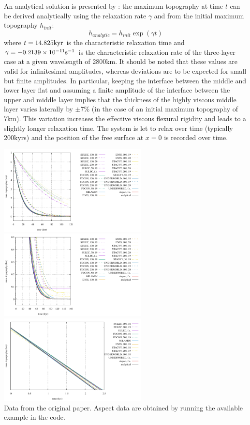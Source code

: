An analytical solution is presented by \cite{ramb67}: 
the maximum topography at time $t$ can be derived analytically using the relaxation rate $\gamma$ 
and from the initial maximum topography $h_{init}$:
\begin{equation}
h_{analytic} =h_{init} \exp (\gamma t)
\end{equation}
where $t = 14.825 {\rm kyr}$ is the characteristic relaxation time and $\gamma = -0.2139 \times 10^{-11} {\rm s}^{-1}$ 
is the characteristic relaxation rate of the three-layer case at a given wavelength of 2800km. 
It should be noted that these values are valid for infinitesimal amplitudes, whereas deviations are to be expected for small but finite amplitudes. In
particular, keeping the interface between the middle and lower layer flat and assuming a finite amplitude of the interface between the upper and middle layer implies that the thickness of the highly viscous middle layer varies laterally by $\pm$7\% (in the case of an initial maximum topography of 7km). This variation increases the effective viscous flexural rigidity and leads to a slightly longer relaxation time.
The system is let to relax over time (typically 200kyrs) and the position of the free surface at $x=0$ is recorded over time.


\begin{center}
\includegraphics[width=7.5cm]{images/benchmark_crsg12/topo.pdf}
\includegraphics[width=7.5cm]{images/benchmark_crsg12/topozoom.pdf}\\
\includegraphics[width=7.5cm]{images/benchmark_crsg12/topozoom2.pdf}\\
{\captionfont Data from the original paper. Aspect data are obtained by running the available example in the code. }
\end{center}
